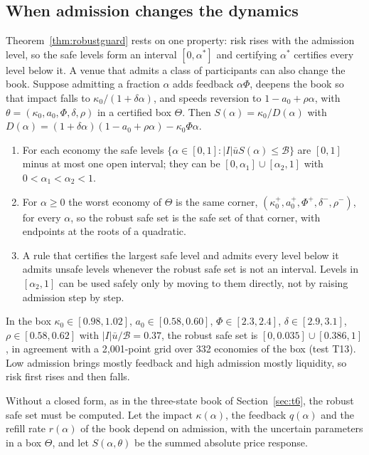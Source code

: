 \subsection{When admission changes the dynamics}\label{sec:venue}
Theorem~\ref{thm:robustguard} rests on one property: risk rises with the admission level, so the safe levels form an interval $[0,\alpha^*]$ and certifying $\alpha^*$ certifies every level below it. A venue that admits a class of participants can also change the book. Suppose admitting a fraction $\alpha$ adds feedback $\alpha\Phi$, deepens the book so that impact falls to $\kappa_0/(1+\delta\alpha)$, and speeds reversion to $1-a_0+\rho\alpha$, with $\theta=(\kappa_0,a_0,\Phi,\delta,\rho)$ in a certified box $\Theta$. Then $S(\alpha)=\kappa_0/D(\alpha)$ with $D(\alpha)=(1+\delta\alpha)(1-a_0+\rho\alpha)-\kappa_0\Phi\alpha$.

\begin{proposition}\label{prop:venue}
\begin{enumerate}[label=(\roman*)]
\item For each economy the safe levels $\{\alpha\in[0,1]:|I|\bar uS(\alpha)\le\mathcal B\}$ are $[0,1]$ minus at most one open interval; they can be $[0,\alpha_1]\cup[\alpha_2,1]$ with $0<\alpha_1<\alpha_2<1$.
\item For $\alpha\ge0$ the worst economy of $\Theta$ is the same corner, $(\kappa_0^+,a_0^+,\Phi^+,\delta^-,\rho^-)$, for every $\alpha$, so the robust safe set is the safe set of that corner, with endpoints at the roots of a quadratic.
\item A rule that certifies the largest safe level and admits every level below it admits unsafe levels whenever the robust safe set is not an interval. Levels in $[\alpha_2,1]$ can be used safely only by moving to them directly, not by raising admission step by step.
\end{enumerate}
\end{proposition}

In the box $\kappa_0\in[0.98,1.02]$, $a_0\in[0.58,0.60]$, $\Phi\in[2.3,2.4]$, $\delta\in[2.9,3.1]$, $\rho\in[0.58,0.62]$ with $|I|\bar u/\mathcal B=0.37$, the robust safe set is $[0,0.035]\cup[0.386,1]$, in agreement with a 2{,}001-point grid over 332 economies of the box (test T13). Low admission brings mostly feedback and high admission mostly liquidity, so risk first rises and then falls.

Without a closed form, as in the three-state book of Section~\ref{sec:t6}, the robust safe set must be computed. Let the impact $\kappa(\alpha)$, the feedback $q(\alpha)$ and the refill rate $r(\alpha)$ of the book depend on admission, with the uncertain parameters in a box $\Theta$, and let $S(\alpha,\theta)$ be the summed absolute price response.

